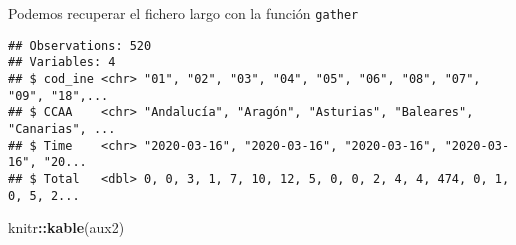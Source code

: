 \documentclass[
]{article}
\newenvironment{Shaded}{\begin{snugshade}}{\end{snugshade}}
\newcommand{\DataTypeTok}[1]{\textcolor[rgb]{0.13,0.29,0.53}{#1}}
\newcommand{\KeywordTok}[1]{\textcolor[rgb]{0.13,0.29,0.53}{\textbf{#1}}}
\newcommand{\NormalTok}[1]{#1}
\newcommand{\OperatorTok}[1]{\textcolor[rgb]{0.81,0.36,0.00}{\textbf{#1}}}
\newcommand{\StringTok}[1]{\textcolor[rgb]{0.31,0.60,0.02}{#1}}
\begin{document}
Podemos recuperar el fichero largo con la función \texttt{gather}

\begin{Shaded}
\end{Shaded}

\begin{verbatim}
## Observations: 520
## Variables: 4
## $ cod_ine <chr> "01", "02", "03", "04", "05", "06", "08", "07", "09", "18",...
## $ CCAA    <chr> "Andalucía", "Aragón", "Asturias", "Baleares", "Canarias", ...
## $ Time    <chr> "2020-03-16", "2020-03-16", "2020-03-16", "2020-03-16", "20...
## $ Total   <dbl> 0, 0, 3, 1, 7, 10, 12, 5, 0, 0, 2, 4, 4, 474, 0, 1, 0, 5, 2...
\end{verbatim}

\begin{Shaded}
\begin{Highlighting}[]
\NormalTok{knitr}\OperatorTok{::}\KeywordTok{kable}\NormalTok{(aux2)}
\end{Highlighting}
\end{Shaded}
\end{document}

